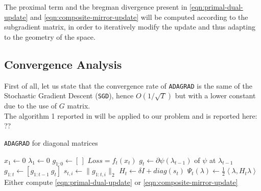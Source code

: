 \documentclass[notitlepage]{article}
\begin{document}
The proximal term and the bregman divergence present in \eqref{eqn:primal-dual-update} and \eqref{eqn:composite-mirror-update} will be computed according to the subgradient matrix, in order to iteratively modify the update and thus adapting to the 
geometry of the space.

\subsection{Convergence Analysis}
\label{sec:convergence}
First of all, let us state that the convergence rate of \texttt{ADAGRAD} is the same of the Stochastic Gradient Descent (\texttt{SGD}), hence $O(1/\sqrt{T})$ but with a lower constant due to the use of $G$ matrix.\\
The algorithm 1 reported in \cite{JMLR:v12:duchi11a} will be applied to our problem and is reported here:\\
{\Large ??}
\begin{flushleft}
  \begin{minipage}{.7\textwidth}
    \begin{algorithm}[H]
      \caption{\texttt{ADAGRAD} for diagonal matrices}
      \label{alg:adagrad}
      \begin{algorithmic}
          \State $x_1 \gets 0$
          \State $\lambda_1 \gets 0$
          \State $g_{1:0} \gets \left[\,\right]$
            \State $Loss = f_t(x_t)$
            \State $g_t \gets \partial \psi(\lambda_{t-1})$ of $\psi$ at $\lambda_{t-1}$
            \State $g_{1:t} \gets \left[ g_{1:t-1}\ g_t \right]$
            \State $s_{t,i} \gets \| g_{1:t,i} \|_2$
            \State $H_t \gets \delta \mathit{I} + diag(s_t)$
            \State $\Psi_t(\lambda) \gets \frac{1}{2} \left\langle \lambda,H_t \lambda \right\rangle$
            \State Either compute \eqref{eqn:primal-dual-update} or \eqref{eqn:composite-mirror-update} 
          \EndFor
        \EndFunction
      \end{algorithmic}  
    \end{algorithm}
  \end{minipage}
\end{flushleft}
\end{document}
